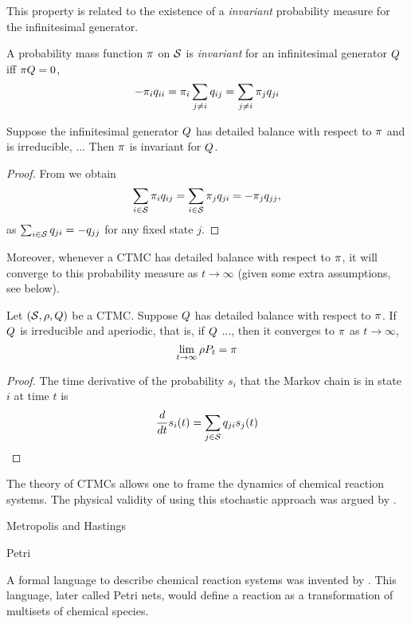 This property is related to the existence of a
\emph{invariant} probability measure for the infinitesimal generator.

\begin{definition}
  A probability mass function $\pi$ on $\mathcal{S}$ is
  \emph{invariant} for an infinitesimal generator $Q$
  iff $\pi Q = 0$, \ie
  \[ -\pi_i q_{ii} = \pi_i \sum_{j \neq i} q_{ij}
                  = \sum_{j \neq i} \pi_j q_{ji} \]
\end{definition}

\begin{lemma}
  Suppose the infinitesimal generator $Q$
  has detailed balance with respect to $\pi$
  and is irreducible, \ie ... %
  Then $\pi$ is invariant for $Q$.
\end{lemma}
\begin{proof}
  From  we obtain
  \[ \sum_{i \in \mathcal{S}} \pi_i q_{ij} =
     \sum_{i \in \mathcal{S}} \pi_j q_{ji} = -\pi_j q_{jj}, \]
  as $\sum_{i \in \mathcal{S}} q_{ji} = -q_{jj}$ for any fixed state $j$.
\end{proof}

Moreover, whenever a CTMC has detailed balance with respect to $\pi$,
it will converge to this probability measure
as $t \to \infty$ (given some extra assumptions, see below).

\begin{lemma}
  Let $\left(\mathcal{S}, \rho, Q\right)$ be a CTMC.
  Suppose $Q$ has detailed balance with respect to $\pi$.
  If $Q$ is irreducible and aperiodic, that is,
  if $Q$ ..., %
  then it converges to $\pi$ as $t \to \infty$, \ie
  \[ \lim_{t \to \infty} \rho P_t = \pi \]
\end{lemma}
\begin{proof}
  The time derivative of the probability $s_i$ that the Markov chain
  is in state $i$ at time $t$ is
  \[ \frac{d}{dt} s_i(t) = \sum_{j \in \mathcal{S}} q_{ji}s_j(t) \]
\end{proof}

The theory of CTMCs allows one to frame the dynamics of
chemical reaction systems.
The physical validity of using this stochastic approach
was argued by \citet{gillespie76}.

Metropolis and Hastings

Petri

A formal language to describe chemical reaction systems
was invented by \citet{petri}.
This language, later called Petri nets,
would define a reaction as a transformation of
multisets of chemical species.

